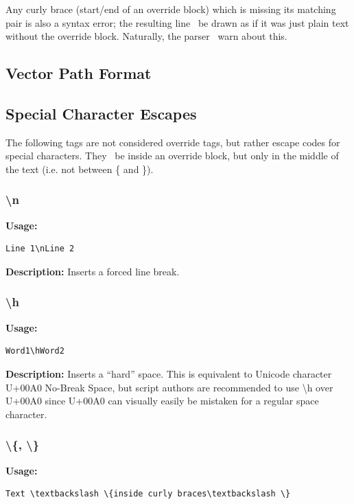 \documentclass{spec}
\begin{document}
Any curly brace (start/end of an override block) which is missing its matching pair is also a syntax error; the
resulting line \must\ be drawn as if it was just plain text without the override block. Naturally, the parser
\should\ warn about this.



\subsection{Vector Path Format}



\subsection{Special Character Escapes}
The following tags are not considered override tags, but rather escape codes for special characters. They
\mustnot\ be inside an override block, but only in the middle of the text (i.e. not between \{ and \}).


\subsubsection{\textbackslash n}
\textbf{Usage:}
\begin{verbatim}
Line 1\nLine 2
\end{verbatim}

\textbf{Description:}
Inserts a forced line break.


\subsubsection{\textbackslash h}
\textbf{Usage:}
\begin{verbatim}
Word1\hWord2
\end{verbatim}

\textbf{Description:}
Inserts a ``hard'' space. This is equivalent to Unicode character U+00A0 No-Break Space, but script authors
are recommended to use \textbackslash h over U+00A0 since U+00A0 can visually easily be mistaken for a regular
space character.

\subsubsection{\textbackslash \{, \textbackslash \}}
\textbf{Usage:}
\begin{verbatim}
Text \textbackslash \{inside curly braces\textbackslash \}
\end{verbatim}
\end{document}
